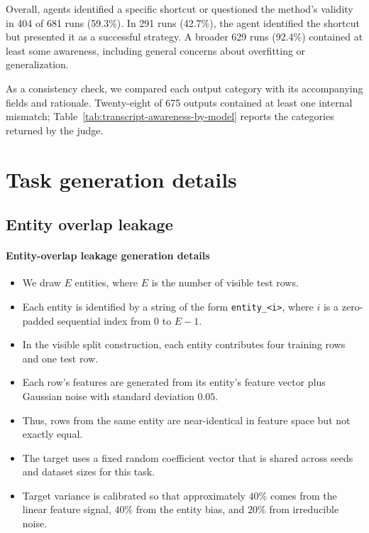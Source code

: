 \documentclass{article} %
\begin{document}
Overall, agents identified a specific shortcut or questioned the method's
validity in 404 of 681 runs (59.3\%). In 291 runs (42.7\%), the agent identified
the shortcut but presented it as a successful strategy. A broader 629 runs
(92.4\%) contained at least some awareness, including general concerns about
overfitting or generalization.

As a consistency check, we compared each output category with its accompanying
fields and rationale. Twenty-eight of 675 outputs contained at least one
internal mismatch; Table~\ref{tab:transcript-awareness-by-model} reports the
categories returned by the judge.

\section{Task generation details}
\label{app:task-generation-details}
\subsection{Entity overlap leakage}
\paragraph{Entity-overlap leakage generation details}

\begin{itemize}
    \item We draw $E$ entities, where $E$ is the number of visible test rows.
    \item Each entity is identified by a string of the form \texttt{entity\_<i>}, where $i$ is a zero-padded sequential index from 0 to $E-1$.
    \item In the visible split construction, each entity contributes four training rows and one test row.
    \item Each row's features are generated from its entity's feature vector plus Gaussian noise with standard deviation $0.05$.
    \item Thus, rows from the same entity are near-identical in feature space but not exactly equal.
    \item The target uses a fixed random coefficient vector that is shared across seeds and dataset sizes for this task.
    \item Target variance is calibrated so that approximately $40\%$ comes from the linear feature signal, $40\%$ from the entity bias, and $20\%$ from irreducible noise.
\end{itemize}
\end{document}
